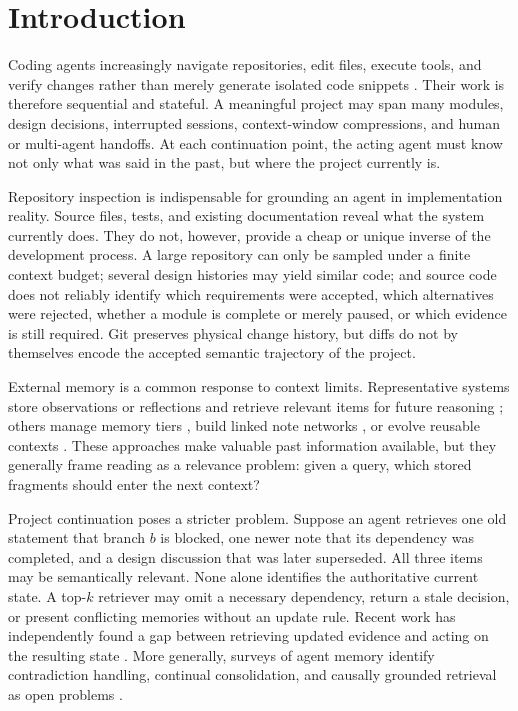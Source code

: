\documentclass[11pt]{article}
\theoremstyle{definition}
\begin{document}
\section{Introduction}

Coding agents increasingly navigate repositories, edit files, execute tools,
and verify changes rather than merely generate isolated code snippets
\citep{yang2024sweagent,jimenez2023swebench}.  Their work is therefore
sequential and stateful.  A meaningful project may span many modules, design
decisions, interrupted sessions, context-window compressions, and human or
multi-agent handoffs.  At each continuation point, the acting agent must know
not only what was said in the past, but where the project currently is.

Repository inspection is indispensable for grounding an agent in implementation
reality.  Source files, tests, and existing documentation reveal what the
system currently does.  They do not, however, provide a cheap or unique inverse
of the development process.  A large repository can only be sampled under a
finite context budget; several design histories may yield similar code; and
source code does not reliably identify which requirements were accepted, which
alternatives were rejected, whether a module is complete or merely paused, or
which evidence is still required.  Git preserves physical change history, but
diffs do not by themselves encode the accepted semantic trajectory of the
project.

External memory is a common response to context limits.  Representative systems
store observations or reflections and retrieve relevant items for future
reasoning \citep{park2023generative,shinn2023reflexion}; others manage memory
tiers \citep{packer2023memgpt}, build linked note networks
\citep{xu2025amem}, or evolve reusable contexts
\citep{zhang2025ace}.  These approaches make valuable past information
available, but they generally frame reading as a relevance problem: given a
query, which stored fragments should enter the next context?

Project continuation poses a stricter problem.  Suppose an agent retrieves one
old statement that branch $b$ is blocked, one newer note that its dependency
was completed, and a design discussion that was later superseded.  All three
items may be semantically relevant.  None alone identifies the authoritative
current state.  A top-$k$ retriever may omit a necessary dependency, return a
stale decision, or present conflicting memories without an update rule.  Recent
work has independently found a gap between retrieving updated evidence and
acting on the resulting state \citep{chao2026stale}.  More generally, surveys of
agent memory identify contradiction handling, continual consolidation, and
causally grounded retrieval as open problems \citep{du2026memory}.
\end{document}
